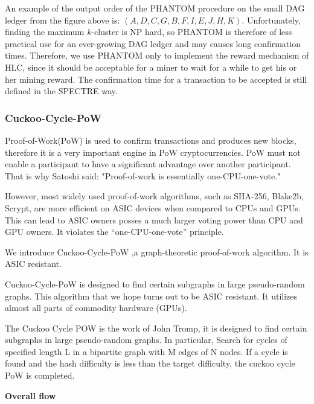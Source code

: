 \documentclass[a4paper,11pt]{article}
\begin{document}
An example of the output order of the PHANTOM procedure on the small DAG ledger
from the figure above is: $(A,D,C,G,B,F,I,E,J,H,K)$. Unfortunately, finding the
maximum $k$-cluster is NP hard, so PHANTOM is therefore of less practical use
for an ever-growing DAG ledger and may causes long confirmation times.
Therefore, we use PHANTOM only to implement the reward mechanism of HLC, since
it should be acceptable for a miner to wait for a while to get his or her mining
reward. The confirmation time for a transaction to be accepted is still defined
in the SPECTRE way.

\subsubsection{Cuckoo-Cycle-PoW}

Proof-of-Work(PoW) is used to confirm transactions and produces new blocks, therefore it is a very important engine in PoW cryptocurrencies. PoW must not enable a participant to have a significant advantage over another participant. That is why Satoshi said: "Proof-of-work is essentially one-CPU-one-vote."

However, most widely used proof-of-work algorithms, such as SHA-256, Blake2b, Scrypt, are more efficient on ASIC devices when compared to CPUs and GPUs. This can lead to ASIC owners posses a much larger voting power than CPU and GPU owners. It violates the “one-CPU-one-vote” principle.

We introduce Cuckoo-Cycle-PoW ,a graph-theoretic proof-of-work algorithm. It is ASIC resistant.

Cuckoo-Cycle-PoW is designed to find certain subgraphs in large pseudo-random graphs. This algorithm that we hope turns out to be ASIC resistant. It utilizes almost all parts of commodity hardware (GPUs).

The Cuckoo Cycle POW is the work of John Tromp, it is designed to find certain subgraphs in large pseudo-random graphs. In particular, Search for cycles of specified length L in a bipartite graph with M edges of N nodes. If a cycle is found and the hash difficulty is less than the target difficulty, the cuckoo cycle PoW is completed.


\textbf{Overall flow}
\end{document}
